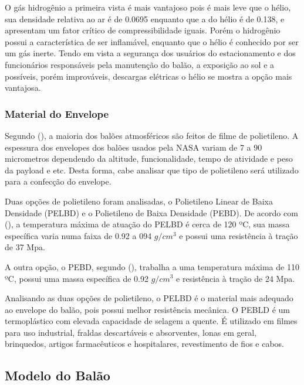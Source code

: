 	O gás hidrogênio a primeira vista é mais vantajoso pois é mais leve que o hélio, sua densidade relativa ao ar é de 0.0695 enquanto que a do hélio é de 0.138, e apresentam um fator crítico de compressibilidade iguais. Porém o hidrogênio possui a característica de ser inflamável, enquanto que o hélio é conhecido por ser um gás inerte. Tendo em vista a segurança dos usuários do estacionamento e dos funcionários responsáveis pela manutenção do balão, a exposição ao sol e a possíveis, porém improváveis,  descargas elétricas o hélio se mostra a opção mais vantajosa.

	\subsubsection{Material do Envelope}

	Segundo  (\citeyear{yajima}), a maioria dos balões atmosféricos são feitos de filme de polietileno. A espessura dos envelopes dos balões usados pela NASA variam de 7 a 90 micrometros dependendo da altitude, funcionalidade, tempo de atividade e peso da payload e etc. Desta forma, cabe analisar que tipo de polietileno será utilizado para a confecção do envelope.

	Duas opções de polietileno foram analisadas, o Polietileno Linear de Baixa Densidade (PELBD) e o Polietileno de Baixa Densidade (PEBD). De acordo com  (\citeyear{coutinho}), a temperatura máxima de atuação do PELBD é cerca de 120 ºC, sua massa específica varia numa faixa de 0.92 a 094 $g/cm^3$ e possui uma resistência à tração de 37 Mpa.

	A outra opção, o PEBD, segundo  (\citeyear{coutinho}), trabalha a uma temperatura máxima de 110 ºC, possui uma massa específica de 0.92 $g/cm^3$ e resistência à tração de 24 Mpa.

	Analisando as duas opções de polietileno, o PELBD é o material mais adequado ao envelope do balão, pois possui melhor resistência mecânica. O PEBLD é um termoplástico com elevada capacidade de selagem a quente. É utilizado em filmes para uso industrial, fraldas descartáveis e absorventes, lonas em geral, brinquedos, artigos farmacêuticos e hospitalares, revestimento de fios e cabos.


\subsection{Modelo do Balão} %
\label{sub:modelo_do_bal_o}

